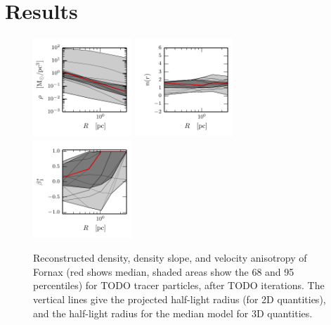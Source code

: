\section{Results}\label{sec:results}

\begin{figure}
    \begin{center}
        \includegraphics[width=0.33\textwidth]{fig/fornax/prof_rho_0}
        \includegraphics[width=0.33\textwidth]{fig/fornax/prof_nr_0}
        \includegraphics[width=0.33\textwidth]{fig/fornax/prof_betastar_1}
        \caption{Reconstructed density, density slope, and velocity
          anisotropy of Fornax (red shows median, shaded areas
          show the 68 and 95 percentiles) for TODO tracer particles, after
          TODO iterations. The vertical lines give the projected
          half-light radius (for 2D quantities), and the half-light
          radius for the median model for 3D quantities.}
        \label{fig:fornax}
    \end{center}
\end{figure}

